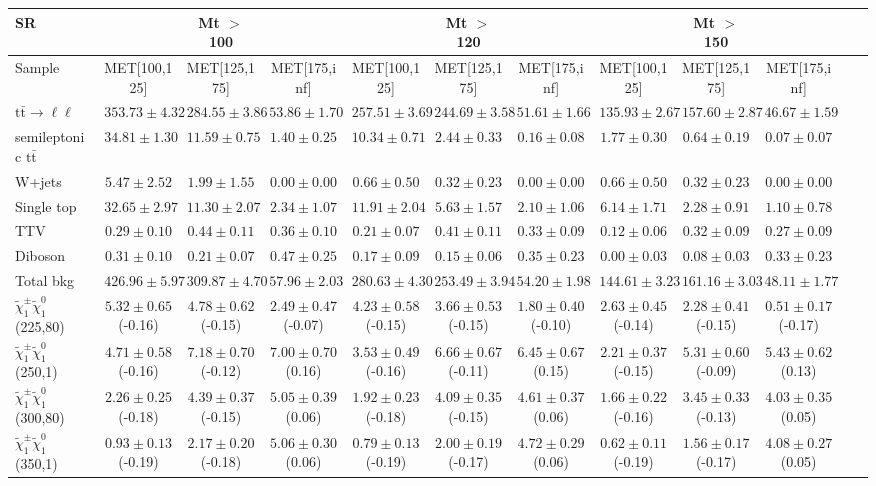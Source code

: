 \begin{table}
\begin{center}
\small
\begin{tabular}{lccccccccccc}
\hline
SR & & Mt $>$ 100 & & & Mt $>$ 120 & & &Mt $>$ 150 & & &\\
\hline
Sample&MET[100,125]&MET[125,175]&MET[175,inf]&MET[100,125]&MET[125,175]&MET[175,inf]&MET[100,125]&MET[125,175]&MET[175,inf]&\\
\hline
$\mathrm{t}\bar{\mathrm{t}}\rightarrow \ell\ell$&$353.73\pm4.32$&$284.55\pm3.86$&$53.86\pm1.70$&$257.51\pm3.69$&$244.69\pm3.58$&$51.61\pm1.66$&$135.93\pm2.67$&$157.60\pm2.87$&$46.67\pm1.59$\\
semileptonic $\mathrm{t}\bar{\mathrm{t}}$&$34.81\pm1.30$&$11.59\pm0.75$&$1.40\pm0.25$&$10.34\pm0.71$&$2.44\pm0.33$&$0.16\pm0.08$&$1.77\pm0.30$&$0.64\pm0.19$&$0.07\pm0.07$\\
W+jets&$5.47\pm2.52$&$1.99\pm1.55$&$0.00\pm0.00$&$0.66\pm0.50$&$0.32\pm0.23$&$0.00\pm0.00$&$0.66\pm0.50$&$0.32\pm0.23$&$0.00\pm0.00$\\
Single top&$32.65\pm2.97$&$11.30\pm2.07$&$2.34\pm1.07$&$11.91\pm2.04$&$5.63\pm1.57$&$2.10\pm1.06$&$6.14\pm1.71$&$2.28\pm0.91$&$1.10\pm0.78$\\
TTV&$0.29\pm0.10$&$0.44\pm0.11$&$0.36\pm0.10$&$0.21\pm0.07$&$0.41\pm0.11$&$0.33\pm0.09$&$0.12\pm0.06$&$0.32\pm0.09$&$0.27\pm0.09$\\
Diboson&$0.31\pm0.10$&$0.21\pm0.07$&$0.47\pm0.25$&$0.17\pm0.09$&$0.15\pm0.06$&$0.35\pm0.23$&$0.00\pm0.03$&$0.08\pm0.03$&$0.33\pm0.23$\\
\hline
Total bkg&$426.96\pm5.97$&$309.87\pm4.70$&$57.96\pm2.03$&$280.63\pm4.30$&$253.49\pm3.94$&$54.20\pm1.98$&$144.61\pm3.23$&$161.16\pm3.03$&$48.11\pm1.77$\\
$\tilde{\chi}_{1}^{\pm}\tilde{\chi}_{1}^{0}$ (225,80)&$5.32\pm0.65$(-0.16)&$4.78\pm0.62$(-0.15)&$2.49\pm0.47$(-0.07)&$4.23\pm0.58$(-0.15)&$3.66\pm0.53$(-0.15)&$1.80\pm0.40$(-0.10)&$2.63\pm0.45$(-0.14)&$2.28\pm0.41$(-0.15)&$0.51\pm0.17$(-0.17)\\
$\tilde{\chi}_{1}^{\pm}\tilde{\chi}_{1}^{0}$ (250,1)&$4.71\pm0.58$(-0.16)&$7.18\pm0.70$(-0.12)&$7.00\pm0.70$(0.16)&$3.53\pm0.49$(-0.16)&$6.66\pm0.67$(-0.11)&$6.45\pm0.67$(0.15)&$2.21\pm0.37$(-0.15)&$5.31\pm0.60$(-0.09)&$5.43\pm0.62$(0.13)\\
$\tilde{\chi}_{1}^{\pm}\tilde{\chi}_{1}^{0}$ (300,80)&$2.26\pm0.25$(-0.18)&$4.39\pm0.37$(-0.15)&$5.05\pm0.39$(0.06)&$1.92\pm0.23$(-0.18)&$4.09\pm0.35$(-0.15)&$4.61\pm0.37$(0.06)&$1.66\pm0.22$(-0.16)&$3.45\pm0.33$(-0.13)&$4.03\pm0.35$(0.05)\\
$\tilde{\chi}_{1}^{\pm}\tilde{\chi}_{1}^{0}$ (350,1)&$0.93\pm0.13$(-0.19)&$2.17\pm0.20$(-0.18)&$5.06\pm0.30$(0.06)&$0.79\pm0.13$(-0.19)&$2.00\pm0.19$(-0.17)&$4.72\pm0.29$(0.06)&$0.62\pm0.11$(-0.19)&$1.56\pm0.17$(-0.17)&$4.08\pm0.27$(0.05)\\
\hline
\hline\hline
\end{tabular}
\end{center}
\end{table}

